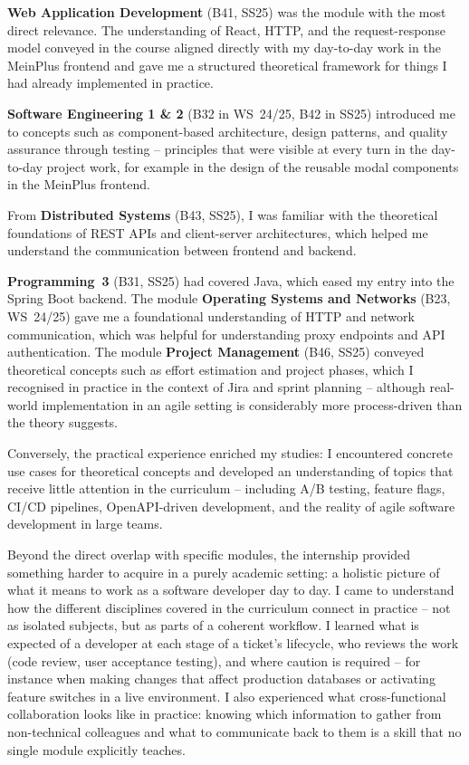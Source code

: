 \documentclass[a4paper, 12pt]{article}
\begin{document}
\textbf{Web Application Development} (B41, SS25) was the module with the most direct
relevance. The understanding of React, HTTP, and the request-response model conveyed
in the course aligned directly with my day-to-day work in the MeinPlus frontend and
gave me a structured theoretical framework for things I had already implemented in
practice.

\textbf{Software Engineering 1 \& 2} (B32 in WS~24/25, B42 in SS25) introduced me
to concepts such as component-based architecture, design patterns, and quality assurance
through testing -- principles that were visible at every turn in the day-to-day project
work, for example in the design of the reusable modal components in the MeinPlus
frontend.

From \textbf{Distributed Systems} (B43, SS25), I was familiar with the theoretical
foundations of REST APIs and client-server architectures, which helped me understand
the communication between frontend and backend.

\textbf{Programming~3} (B31, SS25) had covered Java, which eased my entry into the
Spring Boot backend. The module \textbf{Operating Systems and Networks} (B23, WS~24/25)
gave me a foundational understanding of HTTP and network communication, which was
helpful for understanding proxy endpoints and API authentication. The module
\textbf{Project Management} (B46, SS25) conveyed theoretical concepts such as effort
estimation and project phases, which I recognised in practice in the context of Jira
and sprint planning -- although real-world implementation in an agile setting is
considerably more process-driven than the theory suggests.

Conversely, the practical experience enriched my studies: I encountered concrete use
cases for theoretical concepts and developed an understanding of topics that receive
little attention in the curriculum -- including A/B testing, feature flags, CI/CD
pipelines, OpenAPI-driven development, and the reality of agile software development
in large teams.

Beyond the direct overlap with specific modules, the internship provided something
harder to acquire in a purely academic setting: a holistic picture of what it means to
work as a software developer day to day. I came to understand how the different
disciplines covered in the curriculum connect in practice -- not as isolated subjects,
but as parts of a coherent workflow. I learned what is expected of a developer at each
stage of a ticket's lifecycle, who reviews the work (code review, user acceptance
testing), and where caution is required -- for instance when making changes that
affect production databases or activating feature switches in a live environment. I
also experienced what cross-functional collaboration looks like in practice: knowing
which information to gather from non-technical colleagues and what to communicate back
to them is a skill that no single module explicitly teaches.
\end{document}
